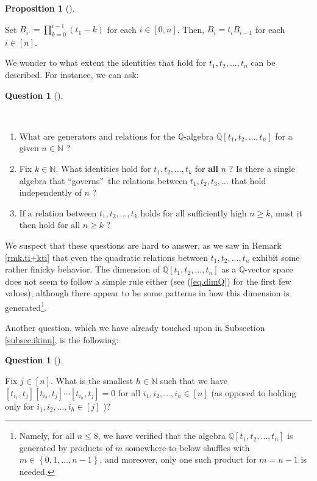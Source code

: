 \documentclass[numbers=enddot,12pt,final,onecolumn,notitlepage]{scrartcl}%
\theoremstyle{definition}
\newtheorem{prop}[theo]{Proposition}
\newenvironment{proposition}[1][]
{\begin{prop}[#1]\begin{leftbar}}
{\end{leftbar}\end{prop}}
\newtheorem{quest}[theo]{Question}
\newenvironment{question}[1][]
{\begin{quest}[#1]\begin{leftbar}}
{\end{leftbar}\end{quest}}
\newenvironment{question}[1][Question]{\noindent\textbf{#1.} }{\ \rule{0.5em}{0.5em}}
\let\prodnonlimits\prod
\renewcommand{\prod}{\prodnonlimits\limits}
\begin{document}
\begin{proposition}
Set $B_{i}:=\prod_{k=0}^{i-1}\left(  t_{1}-k\right)  $ for each $i\in\left[
0,n\right]  $. Then, $B_{i}=t_{i}B_{i-1}$ for each $i\in\left[  n\right]  $.
\end{proposition}

We wonder to what extent the identities that hold for $t_{1},t_{2}%
,\ldots,t_{n}$ can be described. For instance, we can ask:

\begin{question}
\ \ 

\begin{enumerate}
\item[\textbf{(a)}] What are generators and relations for the $\mathbb{Q}%
$-algebra $\mathbb{Q}\left[  t_{1},t_{2},\ldots,t_{n}\right]  $ for a given
$n\in\mathbb{N}$ ?

\item[\textbf{(b)}] Fix $k\in\mathbb{N}$. What identities hold for
$t_{1},t_{2},\ldots,t_{k}$ for \textbf{all} $n$ ? Is there a single algebra
that \textquotedblleft governs\textquotedblright\ the relations between
$t_{1},t_{2},t_{3},\ldots$ that hold independently of $n$ ?

\item[\textbf{(c)}] If a relation between $t_{1},t_{2},\ldots,t_{k}$ holds for
all sufficiently high $n\geq k$, must it then hold for all $n\geq k$ ?
\end{enumerate}
\end{question}

We suspect that these questions are hard to answer, as we saw in Remark
\ref{rmk.ti+kti} that even the quadratic relations between $t_{1},t_{2}%
,\ldots,t_{n}$ exhibit some rather finicky behavior. The dimension of
$\mathbb{Q}\left[  t_{1},t_{2},\ldots,t_{n}\right]  $ as a $\mathbb{Q}$-vector
space does not seem to follow a simple rule either (see (\ref{eq.dimQ}) for
the first few values), although there appear to be some patterns in how this
dimension is generated\footnote{Namely, for all $n\leq8$, we have verified
that the algebra $\mathbb{Q}\left[  t_{1},t_{2},\ldots,t_{n}\right]  $ is
generated by products of $m$ somewhere-to-below shuffles with $m\in\left\{
0,1,\ldots,n-1\right\}  $, and moreover, only one such product for $m=n-1$ is
needed.}.

Another question, which we have already touched upon in Subsection
\ref{subsec.ikinn}, is the following:

\begin{question}
Fix $j\in\left[  n\right]  $. What is the smallest $h\in\mathbb{N}$ such that
we have $\left[  t_{i_{1}},t_{j}\right]  \left[  t_{i_{2}},t_{j}\right]
\cdots\left[  t_{i_{h}},t_{j}\right]  =0$ for all $i_{1},i_{2},\ldots,i_{h}%
\in\left[  n\right]  $ (as opposed to holding only for $i_{1},i_{2}%
,\ldots,i_{h}\in\left[  j\right]  $ )?
\end{question}
\end{document}
